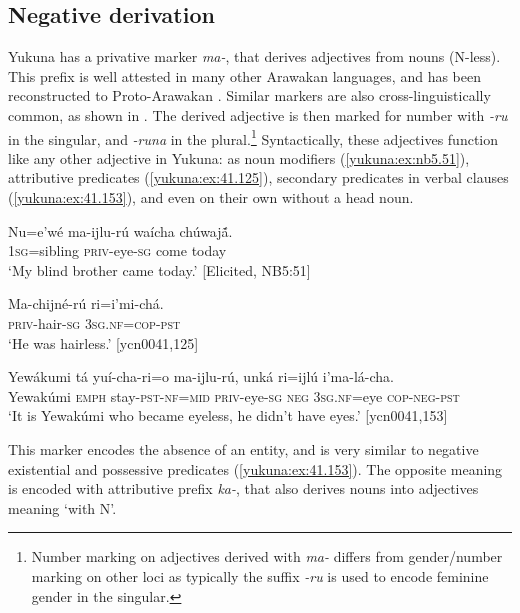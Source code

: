 \documentclass[output=paper,colorlinks,citecolor=brown]{langscibook}
\begin{document}
\subsection{Negative derivation}\label{yukuna:negder}

Yukuna has a privative marker \textit{ma-}, that derives adjectives from nouns (N-less). This prefix is well attested in many other Arawakan languages, and has been reconstructed to Proto-Arawakan \citep[377--378]{Payne1991}. Similar markers are also cross-linguistically common, as shown in \citet[]{Veselinova2013neg.exist}. The derived adjective is then marked for number with \textit{-ru} in the singular, and \textit{-runa} in the plural.\footnote{Number marking on adjectives derived with \textit{ma-} differs from gender/number marking on other loci as typically the suffix \textit{-ru} is used to encode feminine gender in the singular.} Syntactically, these adjectives function like any other adjective in Yukuna: as noun modifiers (\ref{yukuna:ex:nb5.51}), attributive predicates (\ref{yukuna:ex:41.125}), secondary predicates in verbal clauses (\ref{yukuna:ex:41.153}), and even on their own without a head noun. 

\ea\label{yukuna:ex:nb5.51}
\gll Nu=e’wé ma-ijlu-rú waícha chúwajã́.\\
\textsc{1sg}=sibling \textsc{priv}-eye-\textsc{sg} come today \\
\glt ‘My blind brother came today.’ [Elicited, NB5:51]
\z

\ea\label{yukuna:ex:41.125}
\gll Ma-chijné-rú ri=i'mi-chá.\\
\textsc{priv}-hair-\textsc{sg} \textsc{3sg.nf}=\textsc{cop}-\textsc{pst} \\
\glt ‘He was hairless.’ [ycn0041,125]
\z 

\ea\label{yukuna:ex:41.153}
\gll Yewákumi tá yuí-cha-ri=o ma-ijlu-rú, unká ri=ijlú i'ma-lá-cha.\\
Yewakúmi \textsc{emph} stay-\textsc{pst}-\textsc{nf}=\textsc{mid} \textsc{priv}-eye-\textsc{sg} \textsc{neg} \textsc{3sg.nf}=eye \textsc{cop-neg-pst}\\
\glt ‘It is Yewakúmi who became eyeless, he didn't have eyes.’ [ycn0041,153]
\z 

This marker encodes the absence of an entity, and is very similar to negative existential and possessive predicates (\ref{yukuna:ex:41.153}). The opposite meaning is encoded with attributive prefix \textit{ka-}, that also derives nouns into adjectives meaning `with N’. 
\end{document}
